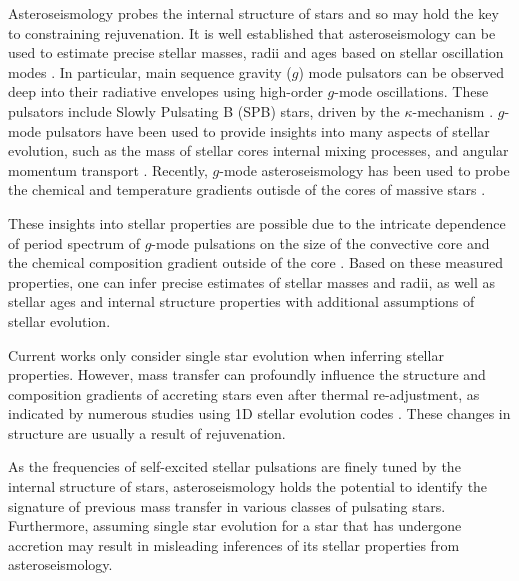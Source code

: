 \documentclass[twocolumn, twocolappendix, oneside]{aastex631}
\newcommand{\gmode}{$g$-mode\xspace}
\begin{document}
Asteroseismology probes the internal structure of stars and so may hold the key to constraining rejuvenation. It is well established that asteroseismology can be used to estimate precise stellar masses, radii and ages based on stellar oscillation modes \citep{Aerts+2010}. In particular, main sequence gravity ($g$) mode pulsators can be observed deep into their radiative envelopes using high-order \gmode oscillations. These pulsators include Slowly Pulsating B (SPB) stars, driven by the $\kappa$-mechanism \citep{Waelkens+1985, Waelkens+1991, Cox+1992, Pamyatnykh+1999}.
\gmode pulsators have been used to provide insights into many aspects of stellar evolution, such as the mass of stellar cores \citep{Johnston+2021, Pedersen+2022} internal mixing processes, and angular momentum transport \citep{Aerts+2019}. Recently, \gmode asteroseismology has been used to probe the chemical and temperature gradients outisde of the cores of massive stars \citep{Michielsen+2021, Pedersen+2018}.

These insights into stellar properties are possible due to the intricate dependence of period spectrum of \gmode pulsations on the size of the convective core and the chemical composition gradient outside of the core \citep[e.g.][]{Miglio+2008}. Based on these measured properties, one can infer precise estimates of stellar masses and radii, as well as stellar ages and internal structure properties with additional assumptions of stellar evolution.

Current works only consider single star evolution when inferring stellar properties. However, mass transfer can profoundly influence the structure and composition gradients of accreting stars even after thermal re-adjustment, as indicated by numerous studies using 1D stellar evolution codes \citep{Renzo+2021, Miszuda+2021}. These changes in structure are usually a result of rejuvenation.

As the frequencies of self-excited stellar pulsations are finely tuned by the internal structure of stars, asteroseismology holds the potential to identify the signature of previous mass transfer in various classes of pulsating stars. Furthermore, assuming single star evolution for a star that has undergone accretion may result in misleading inferences of its stellar properties from asteroseismology.
\end{document}
